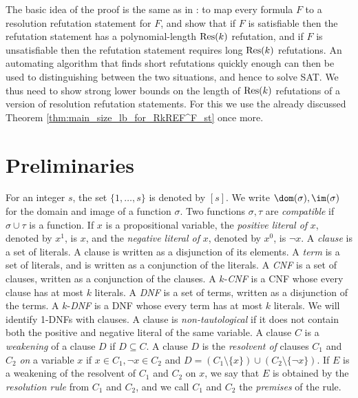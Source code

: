 The basic idea of the proof is the same as in \cite{atserias-muller2019-focs}: to map every formula $F$ to a resolution refutation statement for $F$, and show that if $F$ is satisfiable then the refutation statement has a polynomial-length $\textnormal{Res}(k)$ refutation, and if $F$ is unsatisfiable then the refutation statement requires long $\textnormal{Res}(k)$ refutations. An automating algorithm that finds short refutations quickly enough can then be used to distinguishing between the two situations, and hence to solve SAT. We thus need to show strong lower bounds on the length of $\textnormal{Res}(k)$ refutations of a version of resolution refutation statements. For this we use the already discussed Theorem \ref{thm:main_size_lb_for_RkREF^F_st} once more.

\section{Preliminaries}
\label{sec:preliminaries}
For an integer $s$, the set $\{1, \ldots, s\}$ is denoted by $[s]$. 
We write $\dom(\sigma), \im(\sigma)$ for the domain and image of a function $\sigma$.
Two functions $\sigma, \tau$ are \emph{compatible} if $\sigma \cup \tau$ is a function.
If $x$ is a propositional variable, the \emph{positive literal of} $x$, denoted by $x^1$, is $x$, and the \emph{negative literal of} $x$, denoted by $x^0$, is $\neg x$. A \emph{clause} is a set of literals. A clause is written as a disjunction of its elements. A \emph{term} is a set of literals, and is written as a conjunction of the literals. A \emph{CNF} is a set of clauses, written as a conjunction of the clauses. A $k$-\emph{CNF} is a CNF whose every clause has at most $k$ literals. A \emph{DNF} is a set of terms, written as a disjunction of the terms. A $k$-\emph{DNF} is a DNF whose every term has at most $k$ literals. We will identify 1-DNFs with clauses. 
A clause is \emph{non-tautological} if it does not contain both the positive and negative literal of the same variable. A clause $C$ is a \emph{weakening} of a clause $D$ if $D \subseteq C$. A clause $D$ is the \emph{resolvent of} clauses $C_1$ and $C_2$ \emph{on} a variable $x$ if $x \in C_1, \neg x \in C_2$ and $D = (C_1\setminus \{x\}) \cup (C_2 \setminus \{\neg x\})$. If $E$ is a weakening of the resolvent of $C_1$ and $C_2$ on $x$, we say that $E$ is obtained by the \emph{resolution rule} from $C_1$ and $C_2$, and we call $C_1$ and $C_2$ the \emph{premises} of the rule.

